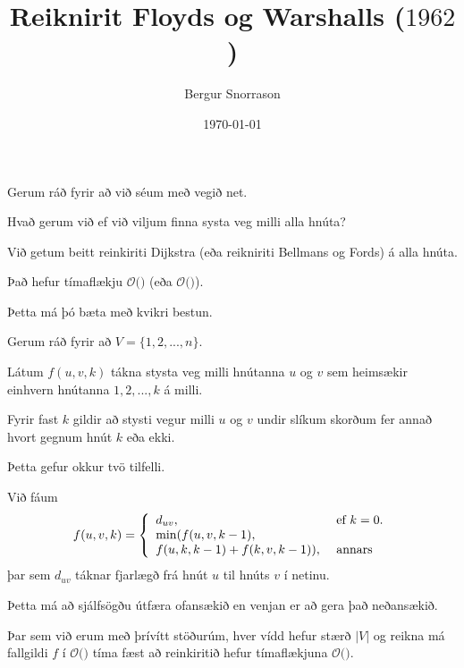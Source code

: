 \title{Reiknirit Floyds og Warshalls ($1962$)}
\author{Bergur Snorrason}
\date{\today}



\frame{\titlepage}

{
	{
		\item<1-> Gerum ráð fyrir að við séum með vegið net.
		\item<2-> Hvað gerum við ef við viljum finna systa veg milli alla hnúta?
		\item<3-> Við getum beitt reinkiriti Dijkstra (eða reikniriti Bellmans og Fords) á alla hnúta.
		\item<4-> Það hefur tímaflækju $\mathcal{O}($$)$ (eða
					$\mathcal{O}($\onslide<6->{$E \cdot V^2$}$)$).
		\item<7-> Þetta má þó bæta með kvikri bestun.
	}
}

{
	{
		\item<1-> Gerum ráð fyrir að $V = \{1, 2, ..., n\}$.
		\item<2-> Látum $f(u, v, k)$ tákna stysta veg milli hnútanna $u$ og $v$ sem heimsækir einhvern hnútanna $1, 2, ..., k$ á milli.
		\item<3-> Fyrir fast $k$ gildir að stysti vegur milli $u$ og $v$ undir slíkum skorðum fer annað hvort gegnum hnút $k$ eða ekki.
		\item<4-> Þetta gefur okkur tvö tilfelli.
		\item<5-> Við fáum
		\[
			f(u, v, k) = \left \{
			\env{array}
			{	{l l}
				d_{uv}, & \text{ ef $k = 0$}.\\
				\min(f(u, v, k - 1), &\\
					f(u, k, k - 1) + f(k, v, k - 1)), & \text{ annars}
			}
			\right .
		\]
				þar sem $d_{uv}$ táknar fjarlægð frá hnút $u$ til hnúts $v$ í netinu.
	}
}

{
	{
		\item<1-> Þetta má að sjálfsögðu útfæra ofansækið en venjan er að gera það neðansækið.
	}
}

{
}

{
	{
		\item<1-> Þar sem við erum með þrívítt stöðurúm, hver vídd hefur stærð $|V|$ og reikna má fallgildi $f$ í
					$\mathcal{O}($$)$ tíma fæst að reinkiritið hefur tímaflækjuna $\mathcal{O}($\onslide<3->{$V^3$}$)$.

	}
}

